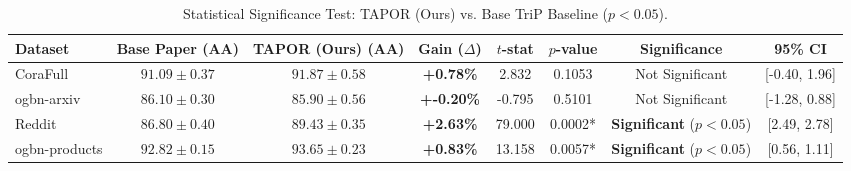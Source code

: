 \begin{table}[t]
\centering
\caption{Statistical Significance Test: TAPOR (Ours) vs. Base TriP Baseline ($p < 0.05$).}
\begin{tabular}{lccccccc}
\hline
\textbf{Dataset} & \textbf{Base Paper (AA)} & \textbf{TAPOR (Ours) (AA)} & \textbf{Gain ($\Delta$)} & \textbf{$t$-stat} & \textbf{$p$-value} & \textbf{Significance} & \textbf{95\% CI} \\
\hline
CoraFull & $91.09 \pm 0.37$ & $91.87 \pm 0.58$ & \textbf{+0.78\%} & 2.832 & 0.1053 & Not Significant & [-0.40, 1.96] \\
ogbn-arxiv & $86.10 \pm 0.30$ & $85.90 \pm 0.56$ & \textbf{+-0.20\%} & -0.795 & 0.5101 & Not Significant & [-1.28, 0.88] \\
Reddit & $86.80 \pm 0.40$ & $89.43 \pm 0.35$ & \textbf{+2.63\%} & 79.000 & 0.0002* & \textbf{Significant} ($p < 0.05$) & [2.49, 2.78] \\
ogbn-products & $92.82 \pm 0.15$ & $93.65 \pm 0.23$ & \textbf{+0.83\%} & 13.158 & 0.0057* & \textbf{Significant} ($p < 0.05$) & [0.56, 1.11] \\
\hline
\end{tabular}
\label{tab:statistical_significance_all}
\end{table}